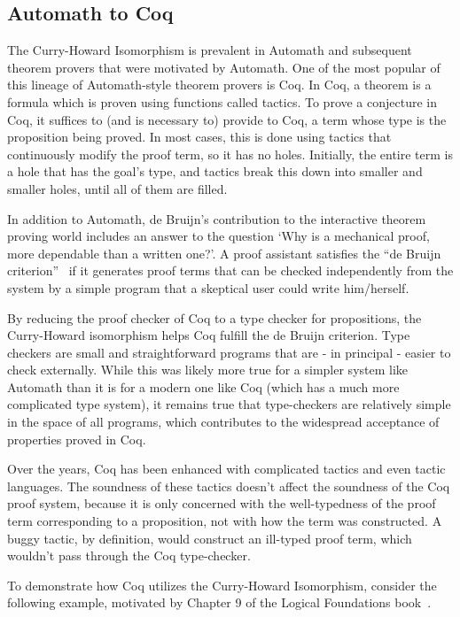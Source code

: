\documentclass{article}
\begin{document}
	\subsection{Automath to Coq}
	\label{sec:coq}
	The Curry-Howard Isomorphism is prevalent in 
	Automath and subsequent theorem provers that 
	were motivated by Automath. One of the most 
	popular of this lineage of Automath-style 
	theorem provers is Coq. In Coq, a theorem is a 
	formula which is proven using functions 
	called tactics. To prove a conjecture in Coq, 
	it suffices to (and is necessary to) provide 
	to Coq, a term whose type is the proposition 
	being proved. In most cases, this is done 
	using tactics that continuously modify the 
	proof term, so it has no holes. Initially, 
	the entire term is a hole that has the goal's 
	type, and tactics break this down into smaller 
	and smaller holes, until all of them are 
	filled.
	
	In addition to Automath, de Bruijn's 
	contribution to the interactive theorem 
	proving world includes an answer to the 
	question `Why is a mechanical proof, 
	more dependable than a written one?'.
	A proof assistant satisfies the 
	``de Bruijn criterion''~\cite
	{10.5555/778522.778527} if it generates 
	proof terms that can be checked 
	independently from the system by a simple 
	program that a skeptical user could write 
	him/herself.
	
	By reducing the proof checker of Coq to 
	a type checker for propositions, the 
	Curry-Howard isomorphism helps Coq
	fulfill the de Bruijn criterion. Type 
	checkers are small and 
	straightforward programs that are - 
	in principal - easier to check 
	externally. 
	While this was likely 
	more true for a simpler system like 
	Automath than it is for a modern 
	one like Coq (which has a much 
	more complicated type system), it 
	remains true that type-checkers are 
	relatively simple in the space of 
	all programs, which contributes to 
	the widespread acceptance of 
	properties proved in Coq.
	
	Over the years, Coq has been enhanced 
	with complicated tactics and even 
	tactic languages. The soundness of 
	these tactics doesn't affect the 
	soundness of the Coq proof system, 
	because it is only concerned with 
	the well-typedness of the proof 
	term corresponding to a proposition,
	not with how the term was constructed. 
	A buggy tactic, by definition, would 
	construct an ill-typed proof term,
	which wouldn't pass through the 
	Coq type-checker.
	
	To demonstrate how Coq utilizes 
	the Curry-Howard Isomorphism, 
	consider the following example, 
	motivated by Chapter 9 of the 
	Logical Foundations 
	book~\cite{Pierce:SF1}.
	
\end{document}
